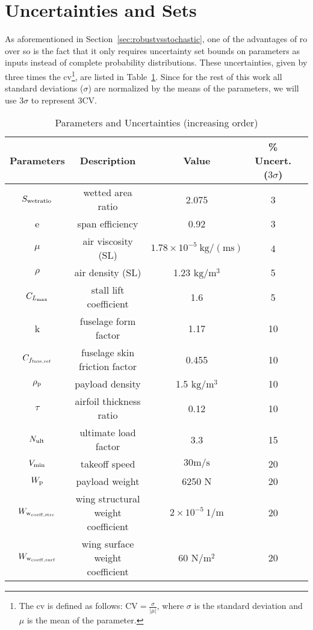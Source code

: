 \section{Uncertainties and Sets}
\label{uncertainties_and_sets}

As aforementioned in Section~\ref{sec:robustvsstochastic}, one of the advantages
of \gls{ro} over \gls{so} is the fact that it only requires
uncertainty set bounds on parameters as inputs instead
of complete probability distributions.
These uncertainties, given by three times the \gls{cv}\footnote{The \gls{cv}
is defined as follows: $\text{CV} = \frac{\sigma}{|\mu|}$, where $\sigma$ is the standard deviation and $\mu$ is the mean of the parameter.},
are listed in Table~\ref{tab:uncertainties}. Since for the rest of this work
all standard deviations ($\sigma$) are normalized by the means of the parameters, we will use $3\sigma$
to represent $3\text{CV}$.

\begin{table}
\begin{center}
\caption{\label{tab:uncertainties} Parameters and Uncertainties (increasing order)}
\begin{tabular}{c c c c c}
\hline
Parameters & Description & Value & \% Uncert. ($3\sigma$) \\
\hline
$S_{\rm{wetratio}}$ & wetted area ratio & 2.075 & 3\\
e & span efficiency & 0.92 & 3\\
$\mu$ & air viscosity (SL) & $1.78 \times 10^{-5}~\mathrm{kg/(ms)}$ & 4 \\
$\rho$ & air density (SL) & 1.23 $\mathrm{kg/m^3}$ & 5 \\
$C_{L_{\rm{max}}}$ & stall lift coefficient & 1.6 & 5\\
k & fuselage form factor & 1.17 & 10\\
$C_{f_{\rm{fuse, ref}}}$ & fuselage skin friction factor & 0.455 & 10 \\
$\rho_{\rm{p}}$ & payload density & 1.5 $\mathrm{kg/m^3}$ & 10 \\
$\tau$ & airfoil thickness ratio & 0.12 & 10\\
$N_{\rm{ult}}$ & ultimate load factor & 3.3 & 15\\
$V_{\rm{min}}$ & takeoff speed & $30 \mathrm{m/s}$ & 20\\
$W_{\rm{p}}$ & payload weight & 6250 N & 20\\
$W_{\rm{w}_{\rm{coeff,strc}}}$ & wing structural weight coefficient & $2 \times 10^{-5}~1/\mathrm{m}$ & 20\\
$W_{\rm{w}_{\rm{coeff,surf}}}$ & wing surface weight coefficient & 60 $\mathrm{N/m^2}$ & 20\\
\hline
\end{tabular}
\end{center}
\end{table}

